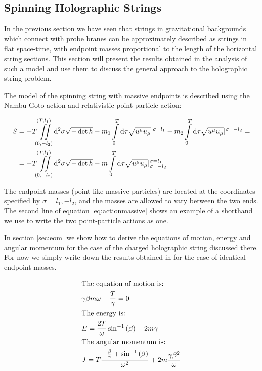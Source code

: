 \documentclass[11pt,a4paper]{article}
\begin{document}
\FloatBarrier
\subsection{Spinning Holographic Strings}
\label{sec:Spinning Holographic Strings}

In the previous section we have seen that strings in gravitational backgrounds which connect with probe branes can be approximately described as strings in flat space-time, with endpoint masses proportional to the length of the horizontal string sections. This section will present the results obtained in the analysis of such a model and use them to discuss the general approach to the holographic string problem.

The model of the spinning string with massive endpoints is described using the Nambu-Goto action and relativistic point particle action:

\begin{align}
\label{eq:actionmassive}
S&=-T\iint\limits_{(0,-l_{2})}^{(T,l_{1})}\mathrm{d}^{2}\sigma\sqrt{-\det h}-m_1\int\limits_{0}^{T}\mathrm{d}\tau\sqrt{u^{\mu}u_{\mu}}|^{\sigma=l_{1}}-m_2\int\limits_{0}^{T}\mathrm{d}\tau\sqrt{u^{\mu}u_{\mu}}|^{\sigma=-l_{2}}=\notag\\
&=-T\iint\limits_{(0,-l_{2})}^{(T,l_{1})}\mathrm{d}^{2}\sigma\sqrt{-\det h}-m\int\limits_{0}^{T}\mathrm{d}\tau\sqrt{u^{\mu}u_{\mu}}|_{\sigma=-l_{2}}^{\sigma=l_{1}}
\end{align}

The endpoint masses (point like massive particles) are located at the coordinates specified by $\sigma=l_1,-l_2$, and the masses are allowed to vary between the two ends. The second line of equation \ref{eq:actionmassive} shows an example of a shorthand we use to write the two point-particle actions as one.

In section \ref{sec:eom} we show how to derive the equations of motion, energy and angular momentum for the case of the charged holographic string discussed there. For now we simply write down the results obtained in \cite{Sonnenschein14} for the case of identical endpoint masses.

\begin{subequations}
\begin{align}
&\text{The equation of motion is:}\notag\\
&\gamma\beta m \omega-\frac{T}{\gamma}=0\\
&\text{The energy is:}\notag\\
&E=\frac{2T}{\omega}\sin^{-1}\left(\beta\right)+2m\gamma\\
&\text{The angular momentum is:}\notag\\
&J=T\frac{-\frac{\beta}{\gamma}+\sin^{-1}\left(\beta\right)}{\omega^{2}}+2m\frac{\gamma\beta^{2}}{\omega}
\end{align}
\end{subequations}
\end{document}
